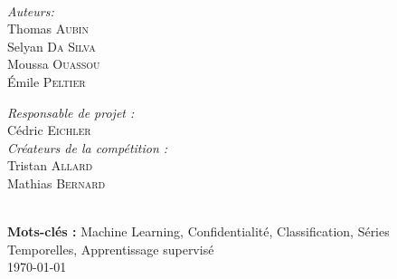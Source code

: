 \begin{titlepage}
\begin{center}
        \HRule \\[1cm]
        \vfill
        \begin{minipage}{0.4\textwidth}
            \begin{flushleft} \large
                \emph{Auteurs:}\\
                    Thomas \textsc{Aubin}\\
                    Selyan \textsc{Da Silva}\\
                    Moussa \textsc{Ouassou}\\
                    Émile \textsc{Peltier}
            \end{flushleft}
        \end{minipage}
        \begin{minipage}{0.4\textwidth}
            \begin{flushright} \large
                \emph{Responsable de projet :} \\
                Cédric \textsc{Eichler}\\
                \emph{Créateurs de la compétition :} \\
                Tristan \textsc{Allard}\\
                Mathias \textsc{Bernard}
            \end{flushright}
        \end{minipage}
        \vfill
        \\[3mm]
        \textbf{Mots-clés :} Machine Learning, Confidentialité, Classification, Séries
        Temporelles, Apprentissage supervisé\\
        \vfill
        {\large \today}
    \end{center}
\end{titlepage}